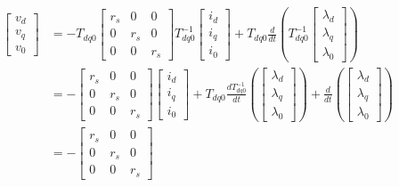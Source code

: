 \begin{equation*}
    \begin{aligned}
        \begin{bmatrix}
            v_d \\ v_q \\ v_0
        \end{bmatrix}
        &= -T_{dq0}
        \begin{bmatrix}
            r_s & 0 & 0\\
            0 & r_s & 0\\
            0 & 0 & r_s
        \end{bmatrix}
        T_{dq0}^{-1}
        \begin{bmatrix}
            i_d \\ i_q \\ i_0
        \end{bmatrix}
        +
        T_{dq0}\frac{d}{dt}\left(T_{dq0}^{-1}\begin{bmatrix}\lambda_d \\ \lambda_q\\ \lambda_0\end{bmatrix}\right)\\
        &= -
        \begin{bmatrix}
            r_s & 0 & 0\\
            0 & r_s & 0\\
            0 & 0 & r_s
        \end{bmatrix}
        \begin{bmatrix}
            i_d \\ i_q \\ i_0
        \end{bmatrix}
        +
        T_{dq0}\frac{dT_{dq0}^{-1}}{dt}\left(\begin{bmatrix}\lambda_d \\ \lambda_q\\ \lambda_0\end{bmatrix}\right) + \frac{d}{dt} \left(\begin{bmatrix}\lambda_d \\ \lambda_q\\ \lambda_0\end{bmatrix}\right) \\ 
        &= -
        \begin{bmatrix}
            r_s & 0 & 0\\
            0 & r_s & 0\\
            0 & 0 & r_s
        \end{bmatrix}

\end{aligned}
\end{equation*}

